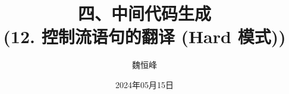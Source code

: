 \documentclass[]{beamer}
\title[中间代码生成]{四、中间代码生成 \\ (12. 控制流语句的翻译 (Hard 模式))}
\author[魏恒峰]{\large 魏恒峰}
\institute{hfwei@nju.edu.cn}
\date{2024年05月15日}
\begin{document}
\maketitle





\thankyou{}

\end{document}
